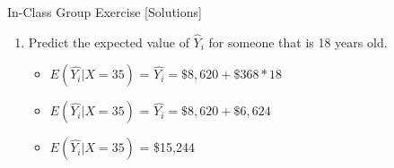 \documentclass[
  8pt,
  ignorenonframetext,
  dvipsnames]{beamer}
\providecommand{\tightlist}{%
  \setlength{\itemsep}{0pt}\setlength{\parskip}{0pt}}
\let\olditem\item
\renewcommand{\item}{%
  \olditem\vspace{4pt}
}
\begin{document}
\begin{frame}{In-Class Group Exercise {[}Solutions{]}}
\begin{enumerate}
\begin{itemize}
    \begin{itemize}
    \tightlist
    \item
      On average, a one-year increase in age is associated with a \$368
      increase in annual income
    \end{itemize}
  \end{itemize}
\item
  Predict the expected value of \(\hat{Y}_i\) for someone that is 18
  years old.

  \begin{itemize}
  \tightlist
  \item
    \(E(\hat{Y_i}|X=35)\) = \(\hat{Y_i} = \$8,620 + \$368*18\)
  \item
    \(E(\hat{Y_i}|X=35)\) = \(\hat{Y_i} = \$8,620 + \$6,624\)
  \item
    \(E(\hat{Y_i}|X=35)\) = \$15,244
  \end{itemize}
\end{enumerate}

\end{frame}
\end{document}
